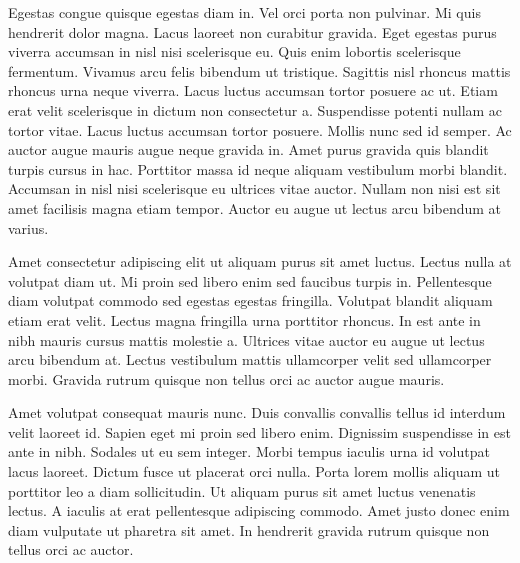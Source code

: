 \documentclass[
  a4paper,
  12pt,
  spanish,
]{scrartcl}
\begin{document}
Egestas congue quisque egestas diam in. Vel orci porta non pulvinar. Mi quis hendrerit dolor magna. Lacus laoreet non curabitur gravida. Eget egestas purus viverra accumsan in nisl nisi scelerisque eu. Quis enim lobortis scelerisque fermentum. Vivamus arcu felis bibendum ut tristique. Sagittis nisl rhoncus mattis rhoncus urna neque viverra. Lacus luctus accumsan tortor posuere ac ut. Etiam erat velit scelerisque in dictum non consectetur a. Suspendisse potenti nullam ac tortor vitae. Lacus luctus accumsan tortor posuere. Mollis nunc sed id semper. Ac auctor augue mauris augue neque gravida in. Amet purus gravida quis blandit turpis cursus in hac. Porttitor massa id neque aliquam vestibulum morbi blandit. Accumsan in nisl nisi scelerisque eu ultrices vitae auctor. Nullam non nisi est sit amet facilisis magna etiam tempor. Auctor eu augue ut lectus arcu bibendum at varius.

Amet consectetur adipiscing elit ut aliquam purus sit amet luctus. Lectus nulla at volutpat diam ut. Mi proin sed libero enim sed faucibus turpis in. Pellentesque diam volutpat commodo sed egestas egestas fringilla. Volutpat blandit aliquam etiam erat velit. Lectus magna fringilla urna porttitor rhoncus. In est ante in nibh mauris cursus mattis molestie a. Ultrices vitae auctor eu augue ut lectus arcu bibendum at. Lectus vestibulum mattis ullamcorper velit sed ullamcorper morbi. Gravida rutrum quisque non tellus orci ac auctor augue mauris.

Amet volutpat consequat mauris nunc. Duis convallis convallis tellus id interdum velit laoreet id. Sapien eget mi proin sed libero enim. Dignissim suspendisse in est ante in nibh. Sodales ut eu sem integer. Morbi tempus iaculis urna id volutpat lacus laoreet. Dictum fusce ut placerat orci nulla. Porta lorem mollis aliquam ut porttitor leo a diam sollicitudin. Ut aliquam purus sit amet luctus venenatis lectus. A iaculis at erat pellentesque adipiscing commodo. Amet justo donec enim diam vulputate ut pharetra sit amet. In hendrerit gravida rutrum quisque non tellus orci ac auctor.


\newpage
\printbibliography
\end{document}
